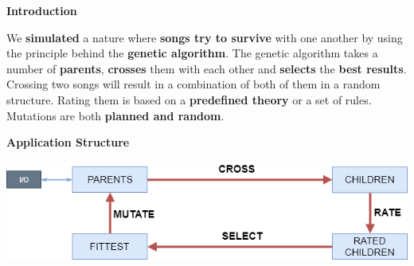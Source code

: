 \documentclass[a0,portrait]{a0poster}
\begin{document}
\begin{multicols}{2} %





\color{SaddleBrown} %
\begin{flushleft}
\Large{\textbf{Introduction}}
\end{flushleft}
\large{We \textbf{simulated} a nature where \textbf{songs try to survive} with one another by using the principle behind the \textbf{genetic algorithm}. The genetic algorithm takes a number of \textbf{parents}, \textbf{crosses} them with each other and \textbf{selects} the \textbf{best results}. Crossing two songs will result in a combination of both of them in a random structure. Rating them is based on a \textbf{predefined theory} or a set of rules. Mutations are both \textbf{planned and random}.}


\color{DarkSlateGray} %



\begin{flushleft}
	\Large{\textbf{Application Structure}}
\end{flushleft}
\vspace{0.1cm}
\begin{center}
	\includegraphics[width=\linewidth]{App_structure}
\end{center}


\end{multicols}
\end{document}
